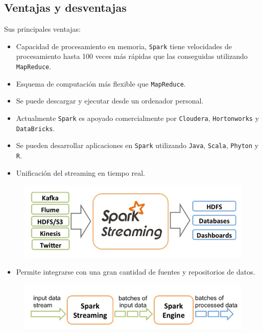 \documentclass[]{article}
\begin{document}
\subsection{Ventajas y desventajas}\label{ventajas-y-desventajas-1}

Sus principales ventajas:

\begin{itemize}
\itemsep1pt\parskip0pt
\item
  Capacidad de procesamiento en memoria, \texttt{Spark} tiene
  velocidades de procesamiento hasta 100 veces más rápidas que las
  conseguidas utilizando \texttt{MapReduce}.
\item
  Esquema de computación más flexible que \texttt{MapReduce}.
\item
  Se puede descargar y ejecutar desde un ordenador personal.
\item
  Actualmente \texttt{Spark} es apoyado comercialmente por
  \texttt{Cloudera}, \texttt{Hortonworks} y \texttt{DataBricks}.
\item
  Se pueden desarrollar aplicaciones en \texttt{Spark} utilizando
  \texttt{Java}, \texttt{Scala}, \texttt{Phyton} y \texttt{R}.
\item
  Unificación del streaming en tiempo real.
\end{itemize}

\begin{figure}[H]
\centering
\includegraphics[width=0.8 \textwidth]{img/spark3.png}
\end{figure}

\begin{itemize}
\itemsep1pt\parskip0pt
\item
  Permite integrarse con una gran cantidad de fuentes y repositorios de
  datos.
\end{itemize}

\begin{figure}[H]
\centering
\includegraphics[width=0.8 \textwidth]{img/spark4.png}
\end{figure}
\end{document}
